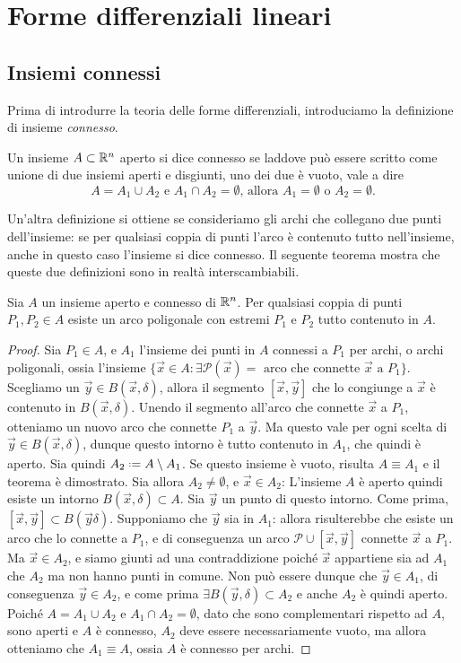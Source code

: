 \chapter{Forme differenziali lineari}
\section{Insiemi connessi}
Prima di introdurre la teoria delle forme differenziali, introduciamo la definizione di insieme \emph{connesso}.
\begin{definizione} \label{d:connesso}
	Un insieme $A\subset\mathbb{R}^n$ aperto si dice connesso se laddove può essere scritto come unione di due insiemi aperti e disgiunti, uno dei due è vuoto, vale a dire
	\begin{equation*}
		A=A_1\cup A_2\text{ e }A_1\cap A_2=\emptyset\text{, allora }A_1=\emptyset\text{ o }A_2=\emptyset.
	\end{equation*}
\end{definizione}
Un'altra definizione si ottiene se consideriamo gli archi che collegano due punti dell'insieme: se per qualsiasi coppia di punti l'arco è contenuto tutto nell'insieme, anche in questo caso l'insieme si dice connesso. Il seguente teorema mostra che queste due definizioni sono in realtà interscambiabili.
\begin{teorema} \label{t:connessione-per-archi}
	Sia $A$ un insieme aperto e connesso di $\mathbb{R}^n$. Per qualsiasi coppia di punti $P_1,P_2\in A$ esiste un arco poligonale con estremi $P_1$ e $P_2$ tutto contenuto in $A$.
\end{teorema}
\begin{proof}
	Sia $P_1\in A$, e $A_1$ l'insieme dei punti in $A$ connessi a $P_1$ per archi, o archi poligonali, ossia l'insieme $\{\vec x\in A\colon\exists\mathscr P(\vec x) =\text{ arco che connette $\vec x$ a $P_1$}\}$.
	Scegliamo un $\vec y\in B(\vec x,\delta)$, allora il segmento $[\vec x,\vec y]$ che lo congiunge a $\vec x$ è contenuto in $B(\vec x,\delta)$.
	Unendo il segmento all'arco che connette $\vec x$ a $P_1$, otteniamo un nuovo arco che connette $P_1$ a $\vec y$.
	Ma questo vale per ogni scelta di $\vec y\in B(\vec x,\delta)$, dunque questo intorno è tutto contenuto in $A_1$, che quindi è aperto.
	Sia quindi $A_2\defeq A\setminus A_1$. Se questo insieme è vuoto, risulta $A\equiv A_1$ e il teorema è dimostrato.
	Sia allora $A_2\neq\emptyset$, e $\vec x\in A_2$: L'insieme $A$ è aperto quindi esiste un intorno $B(\vec x,\delta)\subset A$.
	Sia $\vec y$ un punto di questo intorno. Come prima, $[\vec x,\vec y]\subset B(\vec y\delta)$.
	Supponiamo che $\vec y$ sia in $A_1$: allora risulterebbe che esiste un arco che lo connette a $P_1$, e di conseguenza un arco $\mathscr P\cup[\vec x,\vec y]$ connette $\vec x$ a $P_1$.
	Ma $\vec x\in A_2$, e siamo giunti ad una contraddizione poiché $\vec x$ appartiene sia ad $A_1$ che $A_2$ ma non hanno punti in comune.
	Non può essere dunque che $\vec y\in A_1$, di conseguenza $\vec y\in A_2$, e come prima $\exists B(\vec y,\delta)\subset A_2$ e anche $A_2$ è quindi aperto.
	Poiché $A=A_1\cup A_2$ e $A_1\cap A_2=\emptyset$, dato che sono complementari rispetto ad $A$, sono aperti e $A$ è connesso, $A_2$ deve essere necessariamente vuoto, ma allora otteniamo che $A_1\equiv A$, ossia $A$ è connesso per archi.
\end{proof}
